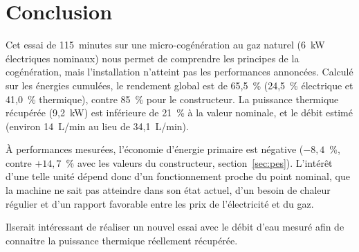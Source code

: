 \section{Conclusion}
\label{sec:conclusion}
Cet essai de 115~minutes sur une micro-cogénération au gaz naturel
(6~kW électriques nominaux) nous permet de comprendre les principes de la cogénération, mais
l'installation n'atteint pas les performances annoncées. Calculé sur les
énergies cumulées, le rendement global est de 65,5~\% (24,5~\%
électrique et 41,0~\% thermique), contre 85~\% pour le constructeur. La
puissance thermique récupérée (9,2~kW) est inférieure de 21~\% à la
valeur nominale, et le débit estimé (environ 14~L/min au lieu de
34,1~L/min).

À performances mesurées, l'économie d'énergie primaire est négative
($-8{,}4$~\%, contre $+14{,}7$~\% avec les valeurs du constructeur,
section~\ref{sec:pes}). L'intérêt d'une telle unité dépend donc d'un
fonctionnement proche du point nominal, que la machine ne sait pas atteindre dans son état actuel, d'un besoin de chaleur régulier et
d'un rapport favorable entre les prix de l'électricité et du gaz.
 
Ilserait intéressant de réaliser un nouvel essai avec le débit
d'eau mesuré afin de connaitre la puissance thermique réellement récupérée.
